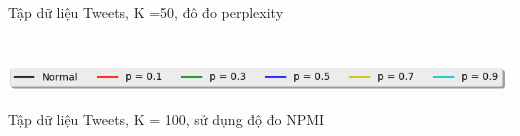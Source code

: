 \documentclass[pdf]{beamer}
\begin{document}
\begin{frame}{Tập dữ liệu Tweets, K =50, đô đo perplexity}
\begin{columns}[T]
\begin{column}{.50\textwidth}
\begin{figure}
		\end{figure}				
	\end{column} %
\end{columns}
\begin{center}
	\includegraphics[width=1\textwidth]{menu.png}	
\end{center}
\end{frame}

\begin{frame}{Tập dữ liệu Tweets, K = 100, sử dụng độ đo NPMI }
\begin{columns}[T] %
\begin{column}{.50\textwidth}
	\begin{figure}
	\end{figure}
\end{column} %
\hfill%
\begin{column}{.50\textwidth}
	\begin{figure}

\end{figure}
\end{column}
\end{columns}
\end{frame}
\end{document}
